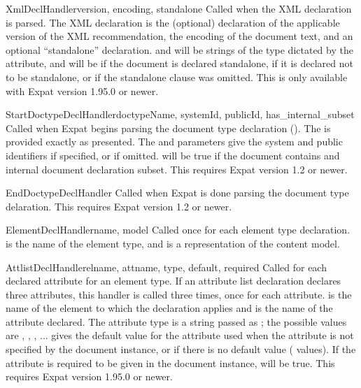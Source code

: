\begin{methoddesc}[xmlparser]{XmlDeclHandler}{version, encoding, standalone}
Called when the XML declaration is parsed.  The XML declaration is the
(optional) declaration of the applicable version of the XML
recommendation, the encoding of the document text, and an optional
``standalone'' declaration.   and  will be
strings of the type dictated by the 
attribute, and  will be  if the document is
declared standalone,  if it is declared not to be standalone,
or  if the standalone clause was omitted.
This is only available with Expat version 1.95.0 or newer.
\end{methoddesc}

\begin{methoddesc}[xmlparser]{StartDoctypeDeclHandler}{doctypeName,
                                                       systemId, publicId,
                                                       has_internal_subset}
Called when Expat begins parsing the document type declaration
().  The  is provided exactly
as presented.  The  and  parameters give
the system and public identifiers if specified, or  if
omitted.   will be true if the document
contains and internal document declaration subset.
This requires Expat version 1.2 or newer.
\end{methoddesc}

\begin{methoddesc}[xmlparser]{EndDoctypeDeclHandler}{}
Called when Expat is done parsing the document type delaration.
This requires Expat version 1.2 or newer.
\end{methoddesc}

\begin{methoddesc}[xmlparser]{ElementDeclHandler}{name, model}
Called once for each element type declaration.   is the name
of the element type, and  is a representation of the
content model.
\end{methoddesc}

\begin{methoddesc}[xmlparser]{AttlistDeclHandler}{elname, attname,
                                                  type, default, required}
Called for each declared attribute for an element type.  If an
attribute list declaration declares three attributes, this handler is
called three times, once for each attribute.   is the name
of the element to which the declaration applies and  is
the name of the attribute declared.  The attribute type is a string
passed as ; the possible values are ,
, , ...
 gives the default value for the attribute used when the
attribute is not specified by the document instance, or  if
there is no default value ( values).  If the attribute
is required to be given in the document instance,  will
be true.
This requires Expat version 1.95.0 or newer.
\end{methoddesc}

